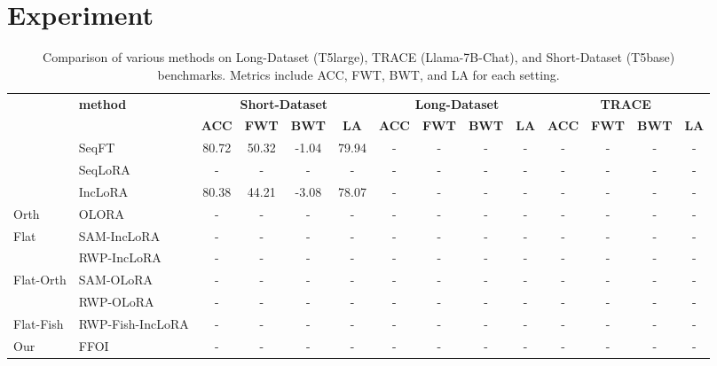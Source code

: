 \documentclass[letterpaper]{article} %
\begin{document}
\section{Experiment}


\begin{table}[thbp]
\centering
\begin{tabular}{llcccccccccccc}
\toprule
 & \multirow{2}{*}{\textbf{method}} 
    & \multicolumn{4}{c}{\textbf{Short-Dataset}} 
    & \multicolumn{4}{c}{\textbf{Long-Dataset }}
    & \multicolumn{4}{c}{\textbf{TRACE}} \\
\cmidrule(lr){3-6} \cmidrule(lr){7-10} \cmidrule(lr){11-14}
 & & \textbf{ACC} & \textbf{FWT} & \textbf{BWT} & \textbf{LA}
   & \textbf{ACC} & \textbf{FWT} & \textbf{BWT} & \textbf{LA}
   & \textbf{ACC} & \textbf{FWT} & \textbf{BWT} & \textbf{LA} \\
\midrule
\multirow{3}{*}{} 
    & SeqFT       & 80.72 & 50.32 & -1.04 & 79.94 & - & - & - & - & - & - & - & - \\
    & SeqLoRA     & - & - & - & - & - & - & - & - & - & - & - & - \\
    & IncLoRA    & 80.38 & 44.21 & -3.08 & 78.07 & - & - & - & - & - & - & - & - \\
\midrule
\multirow{1}{*}{Orth} 
    & OLORA       & - & - & - & - & - & - & - & - & - & - & - & - \\
\midrule
\multirow{2}{*}{Flat} 
    & SAM-IncLoRA & - & - & - & - & - & - & - & - & - & - & - & - \\ 
    & RWP-IncLoRA & - & - & - & - & - & - & - & - & - & - & - & - \\
\midrule
\multirow{2}{*}{Flat-Orth} 
    & SAM-OLoRA & - & - & - & - & - & - & - & - & - & - & - & - \\ 
    & RWP-OLoRA & - & - & - & - & - & - & - & - & - & - & - & - \\
\midrule
\multirow{1}{*}{Flat-Fish} 
    & RWP-Fish-IncLoRA & - & - & - & - & - & - & - & - & - & - & - & - \\ 
\midrule
\multirow{1}{*}{Our} 
    & FFOI         & - & - & - & - & - & - & - & - & - & - & - & - \\
\bottomrule
\end{tabular}
\caption{Comparison of various methods on Long-Dataset (T5large), TRACE (Llama-7B-Chat), and Short-Dataset (T5base) benchmarks. Metrics include ACC, FWT, BWT, and LA for each setting.}
\label{tab:main_cl_benchmark}
\end{table}
\end{document}
